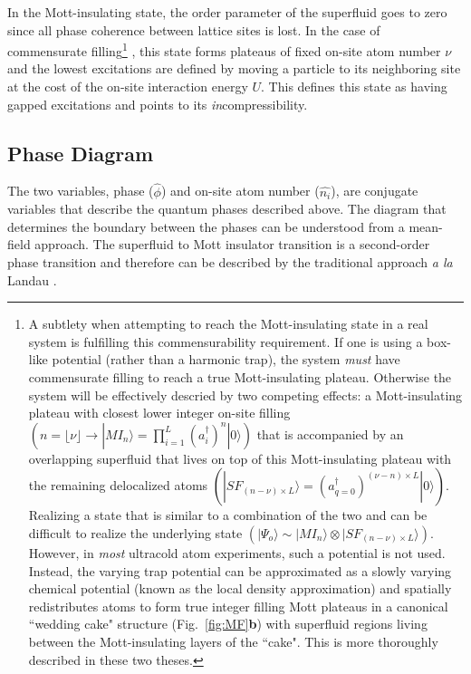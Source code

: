 In the Mott-insulating state, the order parameter of the superfluid goes to zero since all phase coherence between lattice sites is lost. In the case of commensurate filling\footnote{A subtlety when attempting to reach the Mott-insulating state in a real system is fulfilling this commensurability requirement. If one is using a box-like potential (rather than a harmonic trap), the system \emph{must} have commensurate filling to reach a true Mott-insulating plateau. Otherwise the system will be effectively descried by two competing effects: a Mott-insulating plateau with closest lower integer on-site filling $\left ( n=\lfloor {\nu} \rfloor \rightarrow | {MI}_n \rangle  = \prod_{i=1}^L \left ( a^\dagger_i \right )^n | 0 \rangle \right )$ that is accompanied by an overlapping superfluid that lives on top of this Mott-insulating plateau with the remaining delocalized atoms $\left ( |SF_{(n-\nu)\times L}\rangle = \left ( a^\dagger_{q=0} \right )^{(\nu-n)\times L} | 0 \rangle \right )$. Realizing a state that is similar to a combination of the two and can be difficult to realize the underlying state $\left ( | \Psi_o \rangle \sim | {MI}_n \rangle  \otimes |SF_{(n-\nu)\times L}\rangle \right )$. However, in \emph{most} ultracold atom experiments, such a potential is not used. Instead, the varying trap potential can be approximated as a slowly varying chemical potential (known as the local density approximation) and spatially redistributes atoms to form true integer filling Mott plateaus in a canonical ``wedding cake" structure (Fig.~\ref{fig:MF}\textbf{b}) with superfluid regions living between the Mott-insulating layers of the ``cake". This is more thoroughly described in these two theses\cite{Greiner2003,Preiss2015}.}
, this state forms plateaus of fixed on-site atom number $\nu$ and the lowest excitations are defined by moving a particle to its neighboring site at the cost of the on-site interaction energy $U$. This defines this state as having gapped excitations and points to its \emph{in}compressibility.

\subsection{Phase Diagram}

The two variables, phase ($\hat{\phi}$) and on-site atom number ($\hat{n_i}$), are conjugate variables that describe the quantum phases described above. The diagram that determines the boundary between the phases can be understood from a mean-field approach. The superfluid to Mott insulator transition is a second-order phase transition and therefore can be described by the traditional approach \emph{a la} Landau \cite{Landau1937}.

